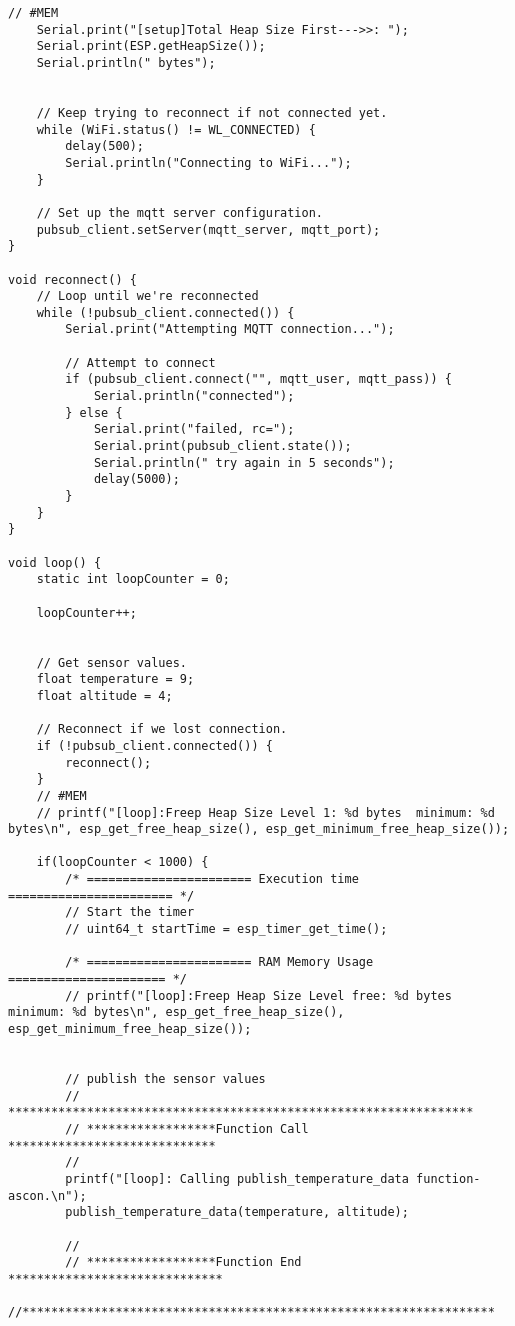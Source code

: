 \begin{lstlisting}[style=CStyle, caption={Main Source C File of The Proposed Implementation}, label={list:mainc-ascon}]
    // #MEM
    Serial.print("[setup]Total Heap Size First--->>: ");
    Serial.print(ESP.getHeapSize());
    Serial.println(" bytes");


    // Keep trying to reconnect if not connected yet.
    while (WiFi.status() != WL_CONNECTED) {
        delay(500);
        Serial.println("Connecting to WiFi...");
    }

    // Set up the mqtt server configuration.
    pubsub_client.setServer(mqtt_server, mqtt_port);
}

void reconnect() {
    // Loop until we're reconnected
    while (!pubsub_client.connected()) {
        Serial.print("Attempting MQTT connection...");

        // Attempt to connect
        if (pubsub_client.connect("", mqtt_user, mqtt_pass)) {
            Serial.println("connected");
        } else {
            Serial.print("failed, rc=");
            Serial.print(pubsub_client.state());
            Serial.println(" try again in 5 seconds");
            delay(5000);
        }
    }
}

void loop() {
    static int loopCounter = 0; 

    loopCounter++;

    
    // Get sensor values.
    float temperature = 9;
    float altitude = 4;

    // Reconnect if we lost connection.
    if (!pubsub_client.connected()) {
        reconnect();
    }
    // #MEM
    // printf("[loop]:Freep Heap Size Level 1: %d bytes  minimum: %d bytes\n", esp_get_free_heap_size(), esp_get_minimum_free_heap_size()); 

    if(loopCounter < 1000) {
        /* ======================= Execution time ======================= */
        // Start the timer
        // uint64_t startTime = esp_timer_get_time();

        /* ======================= RAM Memory Usage ====================== */
        // printf("[loop]:Freep Heap Size Level free: %d bytes  minimum: %d bytes\n", esp_get_free_heap_size(), esp_get_minimum_free_heap_size()); 


        // publish the sensor values 
        // *****************************************************************
        // ******************Function Call *****************************
        //
        printf("[loop]: Calling publish_temperature_data function-ascon.\n");
        publish_temperature_data(temperature, altitude);

        // 
        // ******************Function End ******************************
        //******************************************************************



\end{lstlisting}
